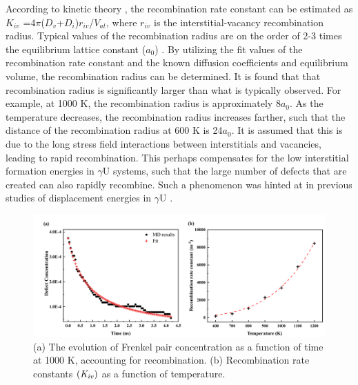 \documentclass[preprint,12pt]{elsarticle}
\begin{document}
\indent According to kinetic theory \cite{was2016fundamentals}, the recombination rate constant can be estimated as $K_{iv}$ =4$\pi$($D_{v}$+$D_{i}$)$r_{iv}$/$V_{at}$, where $r_{iv}$ is the interstitial-vacancy recombination radius. Typical values of the recombination radius are on the order of 2-3 times the equilibrium lattice constant ($a_{0}$) \cite{yu2012radiation, nakashima2015recombination}. By utilizing the fit values of the recombination rate constant and the known diffusion coefficients and equilibrium volume, the recombination radius can be determined. It is found that that recombination radius is significantly larger than what is typically observed. For example, at 1000 K, the recombination radius is approximately 8$a_{0}$. As the temperature decreases, the recombination radius increases farther, such that the distance of the recombination radius at 600 K is 24$a_{0}$. It is assumed that this is due to the long stress field interactions between interstitials and vacancies, leading to rapid recombination. This perhaps compensates for the low interstitial formation energies in $\gamma$U systems, such that the large number of defects that are created can also rapidly recombine. Such a phenomenon was hinted at in previous studies of displacement energies in $\gamma$U \cite{beeler2018calculation}.

\begin{figure}[hbt!]
\centering
\includegraphics[width=1\textwidth]{Fig2.png}
\caption{(a) The evolution of Frenkel pair concentration as a function of time at 1000 K, accounting for recombination. (b) Recombination rate constants $(\it{K}_{iv})$ as a function of temperature.}
\label{fig:recomb}
\end{figure}
\end{document}
